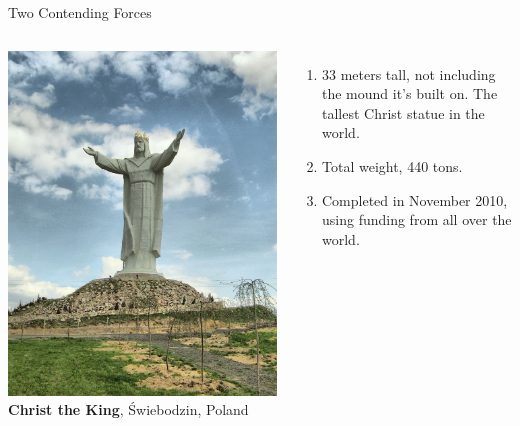 \begin{frame}{Two Contending Forces}
    \begin{columns}[onlytextwidth]
            \centering
            \includegraphics[height=0.75\textheight]{img/christ-statue.jpg} \\

            \textbf{Christ the King}, Świebodzin, Poland
            \begin{enumerate}
                \item 33 meters tall, not including the mound it's built on. The tallest Christ statue in the world.
                \item Total weight, 440 tons.
                \item Completed in November 2010, using funding from all over the world.
            \end{enumerate}
    \end{columns}
\end{frame}

